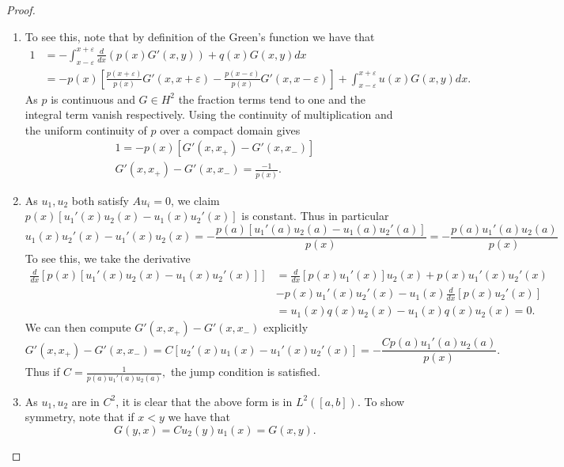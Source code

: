 \documentclass{amsart}
\theoremstyle{plain}
\theoremstyle{definition}
\begin{document}
\begin{proof}
    \begin{enumerate}[label=\alph*.]
        \item To see this, note that by definition of the Green's function we have that 
        \begin{align*}
            1 &= -\int_{x-\varepsilon}^{x+\varepsilon} \frac{d}{dx}\left(p(x) G'(x,y)\right) + q(x) G(x,y) dx \\
            &= -p(x)\left[\frac{p(x+\varepsilon)}{p(x)}G'(x,x+\varepsilon)- \frac{p(x-\varepsilon)}{p(x)}G'(x,x-\varepsilon) \right] +\int_{x-\varepsilon}^{x+\varepsilon} u(x) G(x,y) dx.
        \end{align*}
        As $p$ is continuous and $G \in H^2$ the fraction terms tend to one and the integral term vanish respectively. Using the continuity of multiplication and the uniform continuity of $p$ over a compact domain gives
        \begin{gather*}
            1 =  -p(x)\left[G'(x,x_{+})- G'(x,x_{-}) \right]\\
            G'(x,x_{+})- G'(x,x_{-}) = \frac{-1}{p(x)}.
        \end{gather*}
        \item As $u_1,u_2$ both satisfy $Au_i = 0$, we claim 
        $p(x)\left[u_1'(x)u_2(x) - u_1(x)u_2'(x)\right]$ is constant.
        Thus in particular 
        $$ u_1(x)u_2'(x)-u_1'(x)u_2(x) = -\frac{p(a)\left[u_1'(a)u_2(a) - u_1(a)u_2'(a)\right]}{p(x)} = -\frac{p(a)u_1'(a)u_2(a)}{p(x)} $$
        To see this, we take the derivative 
        \begin{align*}
            \frac{d}{dx}\left[p(x)\left[u_1'(x)u_2(x) - u_1(x)u_2'(x)\right]\right] &= \frac{d}{dx}\left[p(x)u_1'(x)\right]u_2(x) + p(x)u_1'(x)u_2'(x) \\
            &- p(x)u_1'(x)u_2'(x) - u_1(x)\frac{d}{dx}\left[p(x)u_2'(x)\right]\\
            &= u_1(x)q(x)u_2(x) - u_1(x)q(x)u_2(x) = 0.
        \end{align*}
        We can then compute $G'(x,x_{+})-G'(x,x_{-})$ explicitly 
        $$G'(x,x_{+})-G'(x,x_{-}) = C\left[u_2'(x)u_1(x)-u_1'(x)u_2'(x)\right] = -\frac{Cp(a)u_1'(a)u_2(a)}{p(x)}.$$
        Thus if $C = \frac{1}{p(a)u_1'(a)u_2(a)},$ the jump condition is satisfied. 
        \item As $u_1,u_2$ are in $C^2$, it is clear that the above form is in $L^2([a,b]).$ To show symmetry, note that if $x<y$ we have that 
        $$G(y,x) = Cu_2(y)u_1(x) = G(x,y).$$
    \end{enumerate}
\end{proof}
\end{document}
